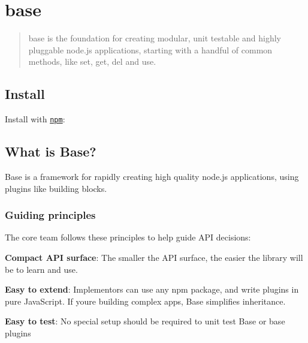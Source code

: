 \href{https://github.com/node-base/base}{\tt } 

\section*{base \href{https://www.npmjs.com/package/base}{\tt } \href{https://npmjs.org/package/base}{\tt } \href{https://npmjs.org/package/base}{\tt } \href{https://travis-ci.org/node-base/base}{\tt }}

\begin{quote}
base is the foundation for creating modular, unit testable and highly pluggable node.\+js applications, starting with a handful of common methods, like {\ttfamily set}, {\ttfamily get}, {\ttfamily del} and {\ttfamily use}. \end{quote}


\subsection*{Install}

Install with \href{https://www.npmjs.com/}{\tt npm}\+:




\subsection*{What is Base?}

Base is a framework for rapidly creating high quality node.\+js applications, using plugins like building blocks.

\subsubsection*{Guiding principles}

The core team follows these principles to help guide A\+PI decisions\+:


\begin{DoxyItemize}
\item {\bfseries Compact A\+PI surface}\+: The smaller the A\+PI surface, the easier the library will be to learn and use.
\item {\bfseries Easy to extend}\+: Implementors can use any npm package, and write plugins in pure Java\+Script. If you\textquotesingle{}re building complex apps, Base simplifies inheritance.
\item {\bfseries Easy to test}\+: No special setup should be required to unit test {\ttfamily Base} or base plugins
\end{DoxyItemize}


